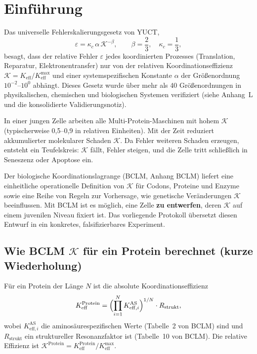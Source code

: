 \documentclass[12pt,a4paper]{article}
\newcommand{\REL}{\mathcal{K}}          %
\begin{document}
	\tableofcontents
	\newpage
	
	\section{Einführung}
	\label{sec:intro}
	Das universelle Fehlerskalierungsgesetz von YUCT,
	\begin{equation}
		\varepsilon = \kappa_c \, \alpha \, \REL^{-\beta}, \qquad \beta = \frac{2}{3},\quad \kappa_c = \frac{1}{3},
		\label{eq:error-law}
	\end{equation}
	besagt, dass der relative Fehler \(\varepsilon\) jedes koordinierten Prozesses (Translation, Reparatur, Elektronentransfer) nur von der relativen Koordinationseffizienz \(\REL = K_{\mathrm{eff}}/K_{\mathrm{eff}}^{\max}\) und einer systemspezifischen Konstante \(\alpha\) der Größenordnung \(10^{-2}\)–\(10^{0}\) abhängt. Dieses Gesetz wurde über mehr als 40 Größenordnungen in physikalischen, chemischen und biologischen Systemen verifiziert (siehe Anhang~L und die konsolidierte Validierungsnotiz).
	
	In einer jungen Zelle arbeiten alle Multi-Protein-Maschinen mit hohem \(\REL\) (typischerweise 0,5–0,9 in relativen Einheiten). Mit der Zeit reduziert akkumulierter molekularer Schaden \(\REL\). Da Fehler weiteren Schaden erzeugen, entsteht ein Teufelskreis: \(\REL\) fällt, Fehler steigen, und die Zelle tritt schließlich in Seneszenz oder Apoptose ein.
	
	Der biologische Koordinationslagrange (BCLM, Anhang BCLM) liefert eine einheitliche operationelle Definition von \(\REL\) für Codons, Proteine und Enzyme sowie eine Reihe von Regeln zur Vorhersage, wie genetische Veränderungen \(\REL\) beeinflussen. Mit BCLM ist es möglich, eine Zelle \textbf{zu entwerfen}, deren \(\REL\) auf einem juvenilen Niveau fixiert ist. Das vorliegende Protokoll übersetzt diesen Entwurf in ein konkretes, falsifizierbares Experiment.
	
	\subsection{Wie BCLM \(\REL\) für ein Protein berechnet (kurze Wiederholung)}
	Für ein Protein der Länge \(N\) ist die absolute Koordinationseffizienz
	\[
	K_{\mathrm{eff}}^{\mathrm{Protein}} = \Bigl( \prod_{i=1}^{N} K_{\mathrm{eff},i}^{\mathrm{AS}} \Bigr)^{1/N} \cdot R_{\mathrm{strukt}},
	\]
	wobei \(K_{\mathrm{eff},i}^{\mathrm{AS}}\) die aminosäurespezifischen Werte (Tabelle~2 von BCLM) sind und \(R_{\mathrm{strukt}}\) ein struktureller Resonanzfaktor ist (Tabelle~10 von BCLM). Die relative Effizienz ist \(\REL^{\mathrm{Protein}} = K_{\mathrm{eff}}^{\mathrm{Protein}}/K_{\mathrm{eff}}^{\max}\).
	
\end{document}

